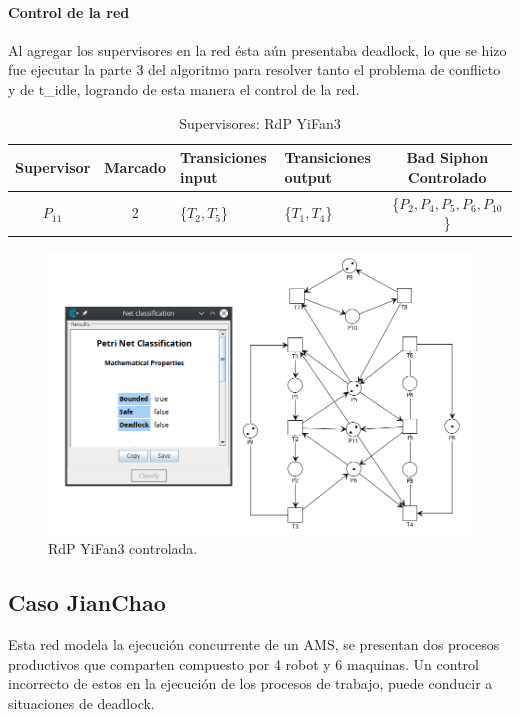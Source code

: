 \paragraph{Control de la red}
\hfill \break
Al agregar los supervisores en la red ésta aún presentaba deadlock, lo que se hizo fue ejecutar la parte 3 del algoritmo para resolver tanto el problema de conflicto y de t\_idle, logrando de esta manera el control de la red.
\begin{table}[H]
    \small
    \centering
    \begin{tabular}{|c|c|P{2cm}|P{2.3cm}|c|}
    \hline
    \textbf{Supervisor} & \textbf{Marcado} & \textbf{Transiciones input} & \textbf{Transiciones output} & \textbf{Bad Siphon Controlado}  \\  \hline
    $P_{11}$ & 2 & \{$T_{2},T_{5}$\} & \{$T_{1},T_{4}$\} & \{$P_2, P_4, P_5,P_6, P_{10}$\} \\ 
    \hline
    \end{tabular}
    \caption{Supervisores: RdP YiFan3}
    \label{tab:Yifan3}
\end{table}
\hfill

\begin{figure}[H]
	\centering
	\includegraphics[width=\textwidth]{Figures/testing/yifan3_controlada.png}
	\caption[RdP YiFan3 controlada]{RdP YiFan3 controlada.}
	\label{fig:yifan3controlada}
 \end{figure}
 
\subsection{Caso JianChao}
Esta red modela la ejecución concurrente de un AMS, se presentan dos procesos productivos que comparten compuesto por 4 robot y 6 maquinas. Un control incorrecto de estos en la ejecución de los procesos de trabajo, puede conducir a situaciones de deadlock.\\


